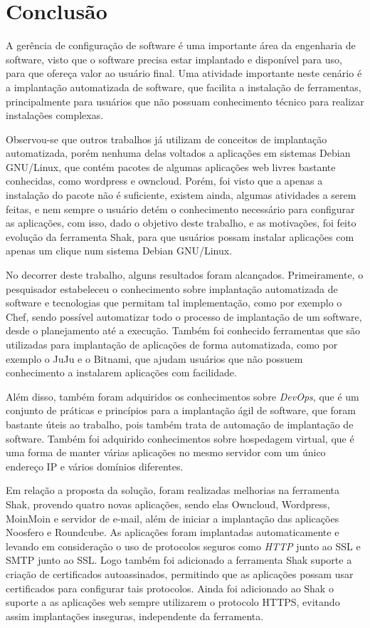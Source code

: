 \chapter{Conclusão}
\label{cap-conclusoes}

A gerência de configuração de software é uma importante área da engenharia de software,
visto que o software precisa estar implantado e disponível para uso, para que ofereça
valor ao usuário final. Uma atividade importante neste cenário é a implantação
automatizada de software, que facilita a instalação de ferramentas, principalmente
para usuários que não possuam conhecimento técnico para realizar instalações complexas.

Observou-se que outros trabalhos já utilizam de conceitos de implantação automatizada,
porém nenhuma delas voltados a aplicações em sistemas Debian GNU/Linux, que contém
pacotes de algumas aplicações web livres bastante conhecidas, como wordpress e
owncloud. Porém, foi visto que a apenas a instalação do pacote não é suficiente,
existem ainda, algumas atividades a serem feitas, e nem sempre o usuário detém
o conhecimento necessário para configurar as aplicações, com isso, dado o objetivo
deste trabalho, e as motivações, foi feito evolução da ferramenta Shak, para
que usuários possam instalar aplicações com apenas um clique num sistema Debian
GNU/Linux.

No decorrer deste trabalho, alguns resultados foram alcançados. Primeiramente, o
pesquisador estabeleceu o conhecimento sobre implantação automatizada
de software e tecnologias que permitam tal implementação, como por exemplo o Chef,
sendo possível automatizar todo o processo de implantação de um software,
desde o planejamento até a execução. Também foi conhecido ferramentas que são
utilizadas para implantação de aplicações de forma automatizada, como por exemplo
o JuJu e o Bitnami, que ajudam usuários que não possuem conhecimento a
instalarem aplicações com facilidade.

Além disso, também foram adquiridos os conhecimentos sobre \textit{DevOps}, que é um conjunto
de práticas e princípios para a implantação ágil de software, que foram bastante
úteis ao trabalho, pois também trata de automação de implantação de software. Também
foi adquirido conhecimentos sobre hospedagem virtual, que é uma forma de manter
várias aplicações no mesmo servidor com um único endereço IP e vários domínios diferentes.

Em relação a proposta da solução, foram realizadas melhorias na ferramenta Shak,
provendo quatro novas aplicações, sendo elas Owncloud, Wordpress, MoinMoin e
servidor de e-mail, além de iniciar a implantação das aplicações Noosfero e Roundcube. As 
aplicações foram implantadas automaticamente e
levando em consideração o uso de protocolos seguros como \textit{HTTP} junto ao SSL e SMTP
junto ao SSL. Logo também foi adicionado a
ferramenta Shak suporte a criação de certificados autoassinados, permitindo que
as aplicações possam usar certificados para configurar tais protocolos. Ainda foi
adicionado ao Shak o suporte a as aplicações web sempre utilizarem
o protocolo HTTPS, evitando assim implantações inseguras, independente da ferramenta.

